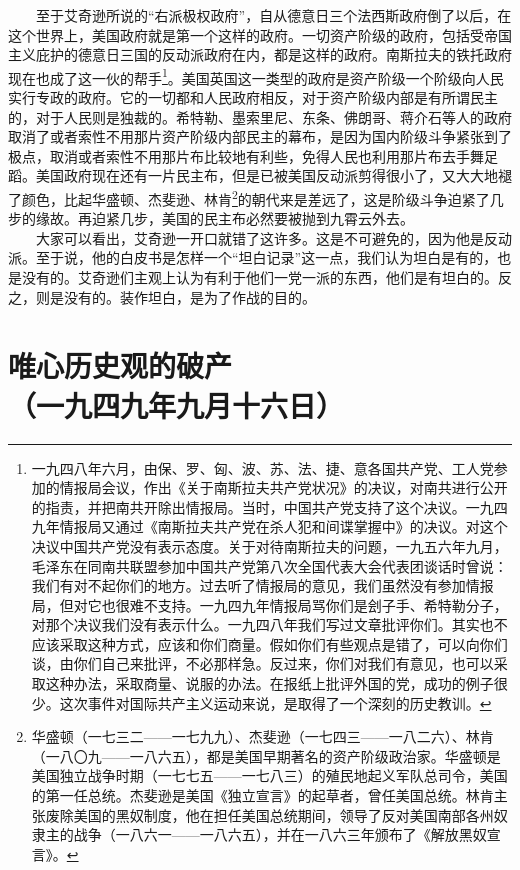 \documentclass[cn,11pt,chinese]{elegantbook}
\def\myformat#1{\hfil\hfil #1}
\begin{document}
　　至于艾奇逊所说的“右派极权政府”，自从德意日三个法西斯政府倒了以后，在这个世界上，美国政府就是第一个这样的政府。一切资产阶级的政府，包括受帝国主义庇护的德意日三国的反动派政府在内，都是这样的政府。南斯拉夫的铁托政府现在也成了这一伙的帮手\footnote[2]{ 一九四八年六月，由保、罗、匈、波、苏、法、捷、意各国共产党、工人党参加的情报局会议，作出《关于南斯拉夫共产党状况》的决议，对南共进行公开的指责，并把南共开除出情报局。当时，中国共产党支持了这个决议。一九四九年情报局又通过《南斯拉夫共产党在杀人犯和间谍掌握中》的决议。对这个决议中国共产党没有表示态度。关于对待南斯拉夫的问题，一九五六年九月，毛泽东在同南共联盟参加中国共产党第八次全国代表大会代表团谈话时曾说：我们有对不起你们的地方。过去听了情报局的意见，我们虽然没有参加情报局，但对它也很难不支持。一九四九年情报局骂你们是刽子手、希特勒分子，对那个决议我们没有表示什么。一九四八年我们写过文章批评你们。其实也不应该采取这种方式，应该和你们商量。假如你们有些观点是错了，可以向你们谈，由你们自己来批评，不必那样急。反过来，你们对我们有意见，也可以采取这种办法，采取商量、说服的办法。在报纸上批评外国的党，成功的例子很少。这次事件对国际共产主义运动来说，是取得了一个深刻的历史教训。}。美国英国这一类型的政府是资产阶级一个阶级向人民实行专政的政府。它的一切都和人民政府相反，对于资产阶级内部是有所谓民主的，对于人民则是独裁的。希特勒、墨索里尼、东条、佛朗哥、蒋介石等人的政府取消了或者索性不用那片资产阶级内部民主的幕布，是因为国内阶级斗争紧张到了极点，取消或者索性不用那片布比较地有利些，免得人民也利用那片布去手舞足蹈。美国政府现在还有一片民主布，但是已被美国反动派剪得很小了，又大大地褪了颜色，比起华盛顿、杰斐逊、林肯\footnote[3]{ 华盛顿（一七三二——一七九九）、杰斐逊（一七四三——一八二六）、林肯（一八〇九——一八六五），都是美国早期著名的资产阶级政治家。华盛顿是美国独立战争时期（一七七五——一七八三）的殖民地起义军队总司令，美国的第一任总统。杰斐逊是美国《独立宣言》的起草者，曾任美国总统。林肯主张废除美国的黑奴制度，他在担任美国总统期间，领导了反对美国南部各州奴隶主的战争（一八六一——一八六五），并在一八六三年颁布了《解放黑奴宣言》。}的朝代来是差远了，这是阶级斗争迫紧了几步的缘故。再迫紧几步，美国的民主布必然要被抛到九霄云外去。\\
　　大家可以看出，艾奇逊一开口就错了这许多。这是不可避免的，因为他是反动派。至于说，他的白皮书是怎样一个“坦白记录”这一点，我们认为坦白是有的，也是没有的。艾奇逊们主观上认为有利于他们一党一派的东西，他们是有坦白的。反之，则是没有的。装作坦白，是为了作战的目的。\\
\newpage\section*{\myformat{唯心历史观的破产}\\\myformat{（一九四九年九月十六日）}}
\end{document}
